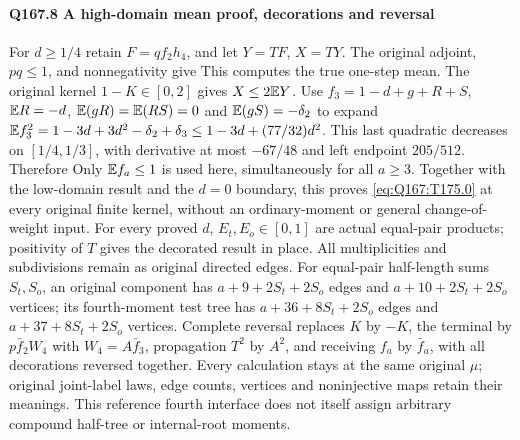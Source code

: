 \paragraph{Q167.8 A high-domain mean proof, decorations and reversal}\label{part:Q167.8}
For $d\ge\allowbreak 1/4$ retain $F=\allowbreak qf_2h_4$, and let $Y=\allowbreak TF$, $X=\allowbreak TY$.
The original adjoint, $pq\le\allowbreak 1$, and nonnegativity give
This computes the true one-step mean.
The original kernel $1-K\in[0,\allowbreak 2]$ gives $X\le\allowbreak 2\mathbb E Y$.
Use $f_3=\allowbreak 1-d+g+R+S$, $\mathbb E R=\allowbreak -d$,
$\mathbb E(gR)=\allowbreak \mathbb E(RS)=\allowbreak 0$ and $\mathbb E(gS)=\allowbreak -\delta_2$ to expand
$\mathbb E f_3^2=\allowbreak 1-3d+3d^2-\delta_2+\delta_3\le\allowbreak 1-3d+(77/32)d^2$.
This last quadratic decreases on $[1/4,\allowbreak 1/3]$, with derivative at most
$-67/48$ and left endpoint $205/512$. Therefore
Only $\mathbb E f_a\le\allowbreak 1$ is used here, simultaneously for all $a\ge\allowbreak 3$.
Together with the low-domain result and the $d=\allowbreak 0$ boundary, this proves
\eqref{eq:Q167:T175.0} at every original finite kernel, without an
ordinary-moment or general change-of-weight input.
For every proved $d$, $E_t,\allowbreak E_o\in[0,\allowbreak 1]$ are actual equal-pair products;
positivity of $T$ gives the decorated result in place.
All multiplicities and subdivisions remain as original directed edges.
For equal-pair half-length sums $S_t,\allowbreak S_o$, an original component has
$a+9+2S_t+2S_o$ edges and $a+10+2S_t+2S_o$ vertices;
its fourth-moment test tree has $a+36+8S_t+2S_o$ edges and
$a+37+8S_t+2S_o$ vertices.
Complete reversal replaces $K$ by $-K$, the terminal by
$p\bar f_2W_4$ with $W_4=\allowbreak A\bar f_3$, propagation $T^2$ by $A^2$,
and receiving $f_a$ by $\bar f_a$, with all decorations reversed together.
Every calculation stays at the same original $\mu$; original joint-label
laws, edge counts, vertices and noninjective maps retain their meanings.
This reference fourth interface does not itself assign arbitrary compound
half-tree or internal-root moments.
